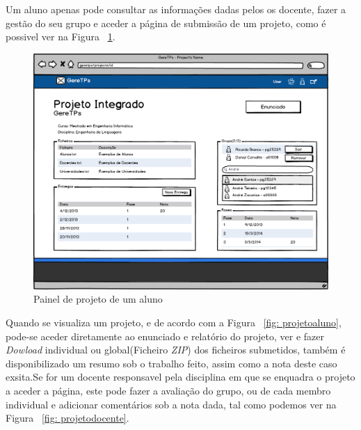 Um aluno apenas pode consultar as informações dadas pelos os docente, fazer a gestão do seu grupo e aceder a página de submissão de um projeto, como é possivel ver na Figura ~\ref{fig: painelprojetoaluno}.\\

\begin{figure}[htbp]
        \centering
        \includegraphics[width=1\textwidth]{images/prototipos/mockups/painelprojetoaluno.png}
         \caption{Painel de projeto de um aluno}
         \label{fig: painelprojetoaluno}
\end{figure}

Quando se visualiza um projeto, e de acordo com a Figura ~\ref{fig: projetoaluno}, pode-se aceder diretamente ao enunciado e relatório do projeto, ver e fazer \emph{Dowload} individual ou global(Ficheiro \emph{ZIP}) dos ficheiros submetidos, também é disponibilizado um resumo sob o trabalho feito, assim como a nota deste caso exsita.Se for um docente responsavel pela disciplina em que se enquadra o projeto a aceder a página, este pode fazer a avaliação do grupo, ou de cada membro individual e adicionar comentários sob a nota dada, tal como podemos ver na Figura ~\ref{fig: projetodocente}.\\

